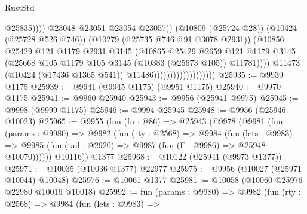 \begin{lexlean}{RustStd}
\begin{coremodule}
                                                        @25835))))
                                                @23048
                                                @23051
                                                @23054
                                                @23057))
                                            (@10809 (@25724 @28))
                                            (@10424 (@25728 @526 @746))
                                            (@10279 (@25735 @746 @91 @3078 @2931))
                                            (@10856
                                              @25429
                                              @121
                                              @1179
                                              @2931
                                              @3145
                                              (@10865
                                                @25429
                                                @2659
                                                @121
                                                @1179
                                                @3145
                                                (@25668
                                                  @105
                                                  @1179
                                                  @105
                                                  @3145
                                                  (@10383 (@25673 @105))
                                                  @11781))))
                                          @11473
                                          (@10424 (@17436 @1365 @541))
                                          @11486)))))))))))))))))))
@25935 := @9939 @1175
@25939 := @9941 (@9945 @1175) (@9951 @1175)
@25940 := @9970 @1175
@25941 := @9960 @25940
@25943 := @9956 (@25941 @9975)
@25945 := @9998 (@9999 @1175)
@25946 := @9994 @25945
@25948 := @9956 (@25946 @10023)
@25965 := @9955
    (fun (fn : @86) =>
    @25943
      (@9978
        (@9981
          (fun (params : @9980) =>
          @9982
            (fun (rty : @2568) =>
            @9984
              (fun (lets : @9983) =>
              @9985 (fun (tail : @2920) => @9987 (fun (Γ : @9986) => @25948 @10070))))))
        @10116))
    @1377
@25968 := @10122 (@25941 (@9973 @1377))
@25971 := @10035 (@10036 @1377) @22977
@25975 := @9956 (@10027 (@25971 @10044) @10048)
@25976 := @10061 @1377
@25981 := @10058 (@10060 @25976 @22980 @10016 @10018)
@25992 := fun (params : @9980) =>
  @9982
    (fun (rty : @2568) =>
    @9984
      (fun (lets : @9983) =>

\end{coremodule}
\end{lexlean}
